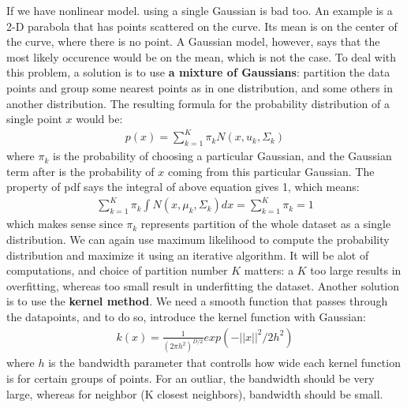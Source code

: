 \documentclass[11pt]{article}
\theoremstyle{plain}
\theoremstyle{definition}
\begin{document}
If we have nonlinear model. using a single Gaussian is bad too. An example is a 2-D parabola that has points scattered on the curve. Its mean is on the center of the curve, where there is no point. A Gaussian model, however, says that the most likely occurence would be on the mean, which is not the case. \newline 
To deal with this problem, a solution is to use \textbf{a mixture of Gaussians}: partition the data points and group some nearest points as in one distribution, and some others in another distribution. The resulting formula for the probability distribution of a single point $x$ would be: \begin{align*}
p(x) = \sum\limits_{k=1}^{K} \pi_k N(x, u_k, \Sigma_k) 
\end{align*}
where $\pi_k$ is the probability of choosing a particular Gaussian, and the Gaussian term after is the probability of $x$ coming from this particular Gaussian. The property of pdf says the integral of above equation gives 1, which means: \begin{align*}
\sum\limits_{k=1}^{K} \pi_k \int N(x, \mu_k, \Sigma_k) dx = \sum\limits_{k=1}^{K} \pi_k = 1 
\end{align*}
which makes sense since $\pi_k$ represents partition of the whole dataset as a single distribution. We can again use maximum likelihood to compute the probability distribution and maximize it using an iterative algorithm. It will be alot of computations, and choice of partition number $K$ matters: a $K$ too large results in overfitting, whereas too small result in underfitting the dataset.\newline 
Another solution is to use the \textbf{kernel method}. We need a smooth function that passes through the datapoints, and to do so, introduce the kernel function with Gaussian: \begin{align*}
k(x) = \frac{1}{(2\pi h^2)^{D/2}} exp(-||x||^2/2h^2)
\end{align*}
where $h$ is the bandwidth parameter that controlls how wide each kernel function is for certain groups of points. For an outliar, the bandwidth should be very large, whereas for neighbor (K closest neighbors), bandwidth should be small. 
\end{document}
